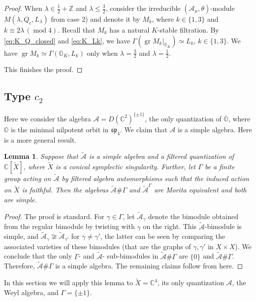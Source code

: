 \documentclass[12pt]{amsart}
\newcommand{\C}{\mathbb{C}}
\newcommand{\A}{\mathcal{A}}
\newcommand{\Orb}{\mathbb{O}}
\newcommand{\Z}{\mathbb{Z}}
\newcommand{\gr}{\operatorname{gr}}
\newcommand{\Weyl}{\mathbb{A}}
\newtheorem{Lem}[Thm]{Lemma}
\theoremstyle{definition}
\numberwithin{equation}{section}
\begin{document}
\begin{proof}
When $\lambda \in \frac{1}{2} + \Z$ and $\lambda \leqslant \frac{3}{2}$, consider the irreducible $(\A_\mu, \theta)$-module $M(\lambda, Q_c, L_\lambda)$ from case 2) and denote it by $M_k$, where $k \in \{1, 3\}$ and $k \equiv 2 \lambda \, (\operatorname{mod} 4)$. Recall that $M_k$ has a natural $K$-stable filtration. By \eqref{eq:K_Q_closed} and \eqref{eq:K_Lk}, we have $\Gamma(\gr M_k |_{\Orb_K}) \simeq L_{k}$, $k \in \{1, 3\}$. We have $\gr M_k \simeq \Gamma(\Orb_K, L_{k})$ only when $\lambda = \frac{3}{2}$ and $\lambda = \frac{1}{2}$.

This finishes the proof.
\end{proof}

\subsection{Type $c_2$}\label{SS_c2}
Here we consider the algebra $\A=D(\C^2)^{\{\pm 1\}}$,
the only quantization of $\overline{\Orb}$, where
$\Orb$ is the minimal nilpotent orbit in $\mathfrak{sp}_4$.
We claim  that $\A$ is a simple algebra. Here is a more general result.

\begin{Lem}\label{Lem:simplicity}
Suppose that $\tilde{\A}$ is a simple algebra and a  filtered quantization of $\C[\tilde{X}]$, where
$\tilde{X}$ is a conical symplectic singularity. Further, let $\Gamma$ be a finite
group acting on $\tilde{\A}$ by filtered algebra automorphisms such that the induced
action on $\tilde{X}$ is faithful. Then the algebras $\tilde{\A}\#\Gamma$ and $\tilde{\A}^\Gamma$
are Morita equivalent and both are simple.
\end{Lem}
\begin{proof}
The proof is standard. For $\gamma\in \Gamma$,  let $\tilde{\A}_\gamma$ denote the bimodule obtained
from the regular bimodule by twisting with $\gamma$ on the right. This $\tilde{\A}$-bimodule is simple,
and $\tilde{\A}_\gamma\not\cong \tilde{\A}_{\gamma'}$ for $\gamma\neq \gamma'$, the latter can be seen by comparing the associated varieties of these bimodules (that are the graphs of $\gamma,\gamma'$ in $X\times X$). We conclude that the only $\Gamma$- and $\tilde{\A}$- sub-bimodules in $\tilde{\A}\#\Gamma$ are
$\{0\}$ and $\tilde{\A}\#\Gamma$. Therefore, $\tilde{\A}\#\Gamma$ is a simple algebra. The remaining claims follow from here.
\end{proof}
In this section we will apply this lemma to $\tilde{X}=\C^4$, its only quantization $\A$, the Weyl algebra,
and $\Gamma=\{\pm 1\}$.
\end{document}
